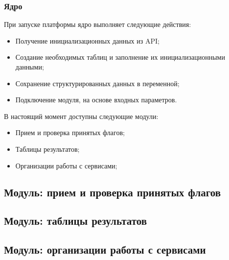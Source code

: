 \subsubsection{Ядро}

При запуске платформы ядро выполняет следующие действия:
\begin{itemize} 
\item Получение инициализационных данных из API;
\item Создание необходимых таблиц и заполнение их инициализационными данными; 
\item Сохранение структурированных данных в переменной;
\item Подключение модуля, на основе входных параметров.
\end{itemize}

В настоящий момент доступны следующие модули:
\begin{itemize} 
\item Прием и проверка принятых флагов;
\item Таблицы результатов; 
\item Организации работы с сервисами;
\end{itemize}


\subsection{Модуль: прием и проверка принятых флагов} %


\subsection{Модуль: таблицы результатов} %


\subsection{Модуль: организации работы с сервисами} %


\clearpage
